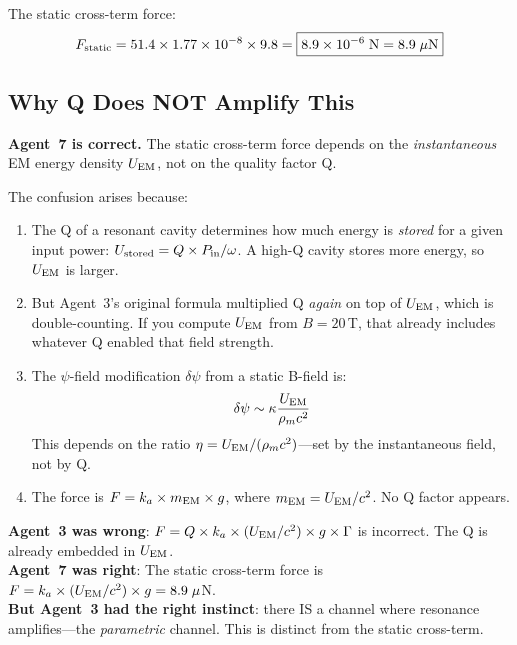 \documentclass[12pt,letterpaper]{article}
\begin{document}
The static cross-term force:
\begin{equation}
F_{\rm static} = 51.4 \times 1.77 \times 10^{-8} \times 9.8 = \boxed{8.9 \times 10^{-6}\;\text{N} = 8.9\;\mu\text{N}}
\end{equation}

\subsection{Why Q Does NOT Amplify This}

\textbf{Agent~7 is correct.} The static cross-term force depends on the
\textit{instantaneous} EM energy density $U_{\rm EM}$, not on the quality factor Q.

The confusion arises because:
\begin{enumerate}
\item The Q of a resonant cavity determines how much energy is \textit{stored}
for a given input power: $U_{\rm stored} = Q \times P_{\rm in} / \omega$.
A high-Q cavity stores more energy, so $U_{\rm EM}$ is larger.

\item But Agent~3's original formula multiplied Q \textit{again} on top of
$U_{\rm EM}$, which is double-counting. If you compute $U_{\rm EM}$ from
$B = 20$\,T, that already includes whatever Q enabled that field strength.

\item The $\psi$-field modification $\delta\psi$ from a static B-field is:
\begin{equation}
\delta\psi \sim \kappa \frac{U_{\rm EM}}{\rho_m c^2}
\end{equation}
This depends on the ratio $\eta = U_{\rm EM}/(\rho_m c^2)$---set by the
instantaneous field, not by Q.

\item The force is $F = k_a \times m_{\rm EM} \times g$, where $m_{\rm EM} = U_{\rm EM}/c^2$.
No Q factor appears.
\end{enumerate}

\begin{tcolorbox}[colback=yellow!10!white, colframe=yellow!60!black, title=Resolution]
\textbf{Agent~3 was wrong}: $F = Q \times k_a \times (U_{\rm EM}/c^2) \times g \times \Gamma$
is incorrect. The Q is already embedded in $U_{\rm EM}$.\\[6pt]
\textbf{Agent~7 was right}: The static cross-term force is $F = k_a \times (U_{\rm EM}/c^2) \times g = 8.9\;\mu$N.\\[6pt]
\textbf{But Agent~3 had the right instinct}: there IS a channel where resonance
amplifies---the \textit{parametric} channel. This is distinct from the static cross-term.
\end{tcolorbox}
\end{document}

